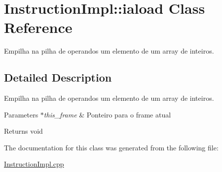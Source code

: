\hypertarget{class_instruction_impl_1_1iaload}{}\section{Instruction\+Impl\+:\+:iaload Class Reference}
\label{class_instruction_impl_1_1iaload}


Empilha na pilha de operandos um elemento de um array de inteiros.  




\subsection{Detailed Description}
Empilha na pilha de operandos um elemento de um array de inteiros. 


\begin{DoxyParams}{Parameters}
{\em $\ast$this\+\_\+frame} & Ponteiro para o frame atual \\
\hline
\end{DoxyParams}
\begin{DoxyReturn}{Returns}
void 
\end{DoxyReturn}


The documentation for this class was generated from the following file\+:\begin{DoxyCompactItemize}
\item 
\hyperlink{_instruction_impl_8cpp}{Instruction\+Impl.\+cpp}\end{DoxyCompactItemize}
